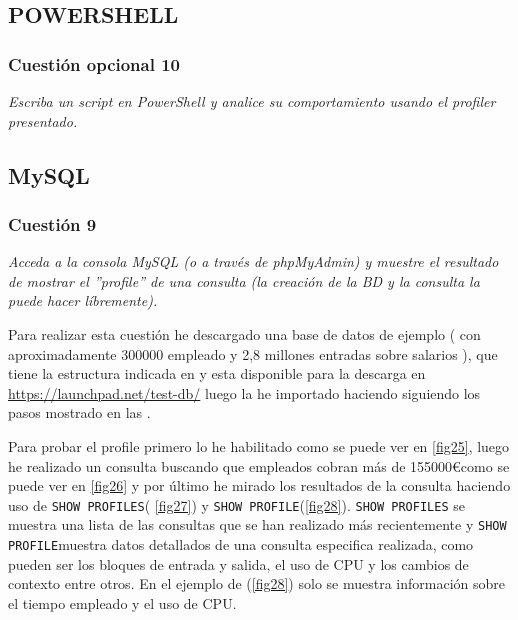 \subsection{POWERSHELL}


\subsubsection{Cuestión opcional 10}
\textit{Escriba un script en PowerShell y analice su comportamiento usando el profiler presentado.}
\subsection{MySQL}



\subsubsection{Cuestión 9}
\textit{Acceda a la consola MySQL (o a través de phpMyAdmin) y muestre el resultado de mostrar el ”profile” de una consulta (la creación de la BD y la consulta la puede hacer líbremente).}
\newline

Para realizar esta cuestión he descargado una base de datos de ejemplo \cite{db}( con aproximadamente 300000 empleado y 2,8 millones entradas sobre salarios ), que tiene la estructura indicada en \cite{db1} y esta disponible para la descarga en \url{https://launchpad.net/test-db/} luego la he importado haciendo siguiendo los pasos mostrado en las .

Para probar el profile primero lo he habilitado como se puede ver en \cref{fig25}, luego he realizado un consulta buscando que empleados cobran más de 155000\euro como se puede ver en \cref{fig26} y por último he mirado los resultados de la consulta haciendo uso de \texttt{SHOW PROFILES}( \cref{fig27}) y \texttt{SHOW PROFILE}(\cref{fig28}). \texttt{SHOW PROFILES} se muestra una lista de las consultas que se han realizado más recientemente y \texttt{SHOW PROFILE}muestra datos detallados de una consulta especifica realizada, como pueden ser los bloques de entrada y salida, el uso de CPU y los cambios de contexto entre otros. En el ejemplo de (\cref{fig28}) solo se muestra información sobre el tiempo empleado y el uso de CPU. \cite{db2}

